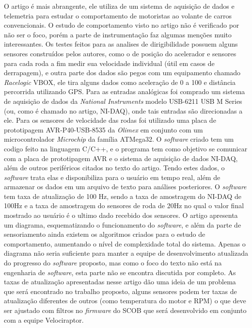 O artigo \cite{racecarInstrumentationFor2012} é mais abrangente, ele utiliza de um sistema de aquisição de dados e telemetria para estudar o comportamento de motoristas ao volante de carros convencionais. O estudo de comportamento visto no artigo não é verificado por não ser o foco, porém a parte de instrumentação faz algumas menções muito interessantes. Os testes feitos para as analises de dirigibilidade possuem alguns sensores construídos pelos autores, como o de posição do acelerador e sensores para cada roda a fim medir sua velocidade individual (útil em casos de derrapagem), e outra parte dos dados são pegos com um equipamento chamado \textit{Racelogic} VBOX, ele tira alguns dados como aceleração de 0 a 100 e distância percorrida utilizando GPS. Para as entradas analógicas foi comprado um sistema de aquisição de dados da \textit{National Instruments} modelo USB-6211 USB M Series (ou, como é chamado no artigo, NI-DAQ), onde tais entradas são direcionadas a ele. Para os sensores de velocidade das rodas foi utilizado uma placa de prototipagem AVR-P40-USB-8535 da \textit{Olimex} em conjunto com um microcontrolador \textit{Microchip} da família ATMega32. O \textit{software} criado tem um codigo feito na linguagem C/C++, e o programa tem como objetivo se comunicar com a placa de prototipagem AVR e o sistema de aquisição de dados NI-DAQ, além de outros periféricos citados no texto do artigo. Tendo estes dados, o \textit{software} trata elas e disponibiliza para o usuário em tempo real, além de armazenar os dados em um arquivo de texto para análises posteriores. O \textit{software} tem taxa de atualização de 100 Hz, sendo a taxa de amostragem do NI-DAQ de 100Hz e a taxa de amostragem do sensores de roda de 20Hz no qual o valor final mostrado ao usuário é o ultimo dado recebido dos sensores. O artigo apresenta um diagrama, esquematizando o funcionamento do \textit{software}, e além da parte de sensoriamento ainda existem os algoritmos criados para o estudo de comportamento, aumentando o nível de complexidade total do sistema. Apenas o diagrama não seria suficiente para manter a equipe de desenvolvimento atualizada do progresso do \textit{software} proposto, mas como o foco do texto não está na engenharia de \textit{software}, esta parte não se encontra discutida por completo. As taxas de atualização apresentadas nesse artigo dão uma ideia de um problema que será encontrado no trabalho proposto, alguns sensores podem ter taxas de atualização diferentes de outros (como temperatura do motor e RPM) o que deve ser ajustado com filtros no \textit{firmware} do SCOB que será desenvolvido em conjunto com a equipe Velociraptor.


